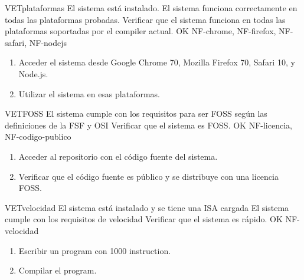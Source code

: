 \begin{testCase}{VET}{plataformas}
    {El sistema está instalado.} %
    {El sistema funciona correctamente en todas las plataformas probadas.} %
    {Verificar que el sistema funciona en todas las plataformas soportadas por
    el \gls{compiler} actual.} %
    {OK} %
    {NF-chrome, NF-firefox, NF-safari, NF-nodejs} %
    \begin{enumerate}[leftmargin=*, topsep=0pt, noitemsep] %
        \item Acceder el sistema desde Google Chrome 70, Mozilla Firefox 70,
        Safari 10, y Node.js.
        \item Utilizar el sistema en esas plataformas.
    \end{enumerate}
\end{testCase}

\begin{testCase}{VET}{FOSS}
    {\NA} %
    {El sistema cumple con los requisitos para ser \gls{FOSS} según las
    definiciones de la \gls{FSF} \parencite{FreeSoftware} y \gls{OSI}
    \parencite{OpenSource}} %
    {Verificar que el sistema es \gls{FOSS}.} %
    {OK} %
    {NF-licencia, NF-codigo-publico} %
    \begin{enumerate}[leftmargin=*, topsep=0pt, noitemsep] %
        \item Acceder al repositorio con el código fuente del sistema.
        \item Verificar que el código fuente es público y se distribuye con una licencia \gls{FOSS}.
    \end{enumerate}
\end{testCase}

\begin{testCase}{VET}{velocidad}
    {El sistema está instalado y se tiene una \gls{ISA} cargada} %
    {El sistema cumple con los requisitos de velocidad} %
    {Verificar que el sistema es rápido.} %
    {OK} %
    {NF-velocidad} %
    \begin{enumerate}[leftmargin=*, topsep=0pt, noitemsep] %
        \item Escribir un \gls{program} con 1000 \gls{instruction}.
        \item Compilar el \gls{program}.
    \end{enumerate}
\end{testCase}

